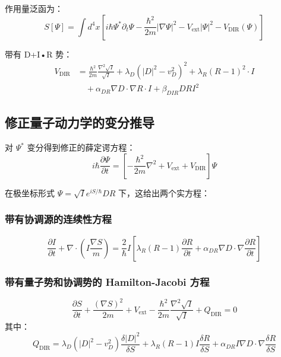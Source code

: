 \documentclass[11pt,a4paper]{article}
\begin{document}
	作用量泛函为：
	\begin{equation}
		S[\Psi] = \int d^4x \left[ i\hbar \Psi^* \partial_t \Psi - \frac{\hbar^2}{2m} |\nabla \Psi|^2 - V_{\text{ext}} |\Psi|^2 - V_{\text{DIR}}(\Psi) \right]
	\end{equation}
	
	带有 D+I•R 势：
	\begin{align}
		V_{\text{DIR}} &= \frac{\hbar^2}{2m} \frac{\nabla^2 \sqrt{I}}{\sqrt{I}} 
		+ \lambda_D (|D|^2 - v_D^2)^2 
		+ \lambda_R (R - 1)^2 \cdot I \\
		&\quad + \alpha_{DR} \nabla D \cdot \nabla R \cdot I 
		+ \beta_{DIR} D R I^2
	\end{align}
	
	\subsection{修正量子动力学的变分推导}
	
	对 $\Psi^*$ 变分得到修正的薛定谔方程：
	\begin{equation}
		i\hbar \frac{\partial \Psi}{\partial t} = \left[ -\frac{\hbar^2}{2m} \nabla^2 + V_{\text{ext}} + V_{\text{DIR}} \right] \Psi
	\end{equation}
	
	在极坐标形式 $\Psi = \sqrt{I} e^{iS/\hbar} D R$ 下，这给出两个实方程：
	
	\subsubsection{带有协调源的连续性方程}
	\begin{equation}
		\frac{\partial I}{\partial t} + \nabla \cdot \left( I \frac{\nabla S}{m} \right) = \frac{2}{\hbar} I \left[ \lambda_R (R-1) \frac{\partial R}{\partial t} + \alpha_{DR} \nabla D \cdot \nabla \frac{\partial R}{\partial t} \right]
	\end{equation}
	
	\subsubsection{带有量子势和协调势的 Hamilton-Jacobi 方程}
	\begin{equation}
		\frac{\partial S}{\partial t} + \frac{(\nabla S)^2}{2m} + V_{\text{ext}} - \frac{\hbar^2}{2m} \frac{\nabla^2 \sqrt{I}}{\sqrt{I}} + Q_{\text{DIR}} = 0
	\end{equation}
	其中：
	\begin{equation}
		Q_{\text{DIR}} = \lambda_D (|D|^2 - v_D^2) \frac{\delta |D|^2}{\delta S} 
		+ \lambda_R (R-1) I \frac{\delta R}{\delta S}
		+ \alpha_{DR} I \nabla D \cdot \nabla \frac{\delta R}{\delta S}
	\end{equation}
	
\end{document}
